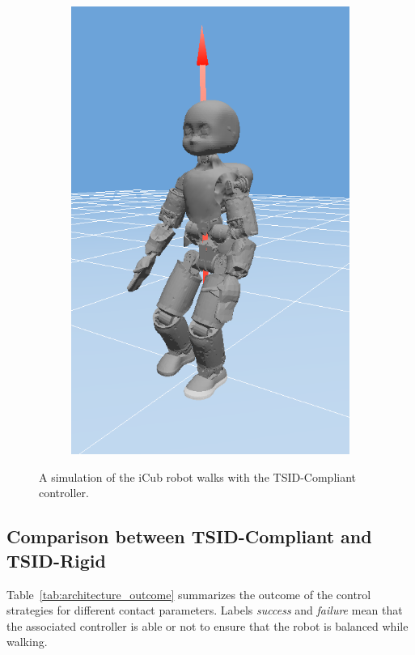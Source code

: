\begin{figure}[t]
\begin{subfigure}[b]{0.32\textwidth}
        \includegraphics[width=\columnwidth]{chapter_compliant_contact/figures/step3.png}
    \end{subfigure}
    \caption{A simulation of the iCub robot walks with the TSID-Compliant controller.}
\end{figure}

\subsection{Comparison between TSID-Compliant and TSID-Rigid}
Table~\ref{tab:architecture_outcome} summarizes the outcome of the control strategies for different contact parameters. Labels \emph{success} and \emph{failure} mean that the associated controller is able or not to ensure that the robot is balanced while walking.

